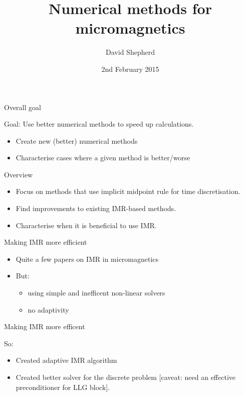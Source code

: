 \documentclass[18pt]{beamer}
\title{Numerical methods for micromagnetics}
\author[David Shepherd]{David Shepherd}
\institute[UoM]{The University of Manchester}
\date{2nd February 2015}
\newlength{\wideitemsep}
\let\olditem\item
\renewcommand{\item}{\setlength{\itemsep}{\wideitemsep}\olditem}
\begin{document}
\begin{frame}
  \titlepage
\end{frame}

\begin{frame}{Overall goal}
  \begin{center}
    {\huge Goal: Use better numerical methods to speed up calculations.}
  \end{center}

  \begin{itemize}
  \item Create new (better) numerical methods
  \item Characterise cases where a given method is better/worse
  \end{itemize}
\end{frame}

\begin{frame}{Overview}
  \begin{itemize}
  \item Focus on methods that use implicit midpoint rule for time discretisation.
  \item Find improvements to existing IMR-based methods.
  \item Characterise when it is beneficial to use IMR.
  \end{itemize}
\end{frame}


\begin{frame}{Making IMR more efficient}

  \begin{itemize}
  \item Quite a few papers on IMR in micromagnetics
  \item But:
    \begin{itemize}
    \item using simple and inefficent non-linear solvers
    \item no adaptivity
    \end{itemize}
  \end{itemize}
\end{frame}

\begin{frame}{Making IMR more efficent}

  So:
  \begin{itemize}
  \item Created adaptive IMR algorithm
  \item Created better solver for the discrete problem [caveat: need an
    effective preconditioner for LLG block].
  \end{itemize}

\end{frame}
\end{document}
